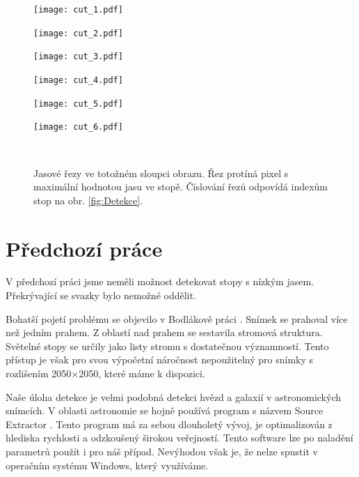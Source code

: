 \begin{figure}[htbp]
    \centering
    \begin{minipage}[c]{0.163\textwidth}
        \centering\texttt{[image: cut\_1.pdf]}
    \end{minipage}
    \begin{minipage}[c]{\xx \textwidth}
        \centering\texttt{[image: cut\_2.pdf]}
    \end{minipage}
    \begin{minipage}[c]{\xx \textwidth}
        \centering\texttt{[image: cut\_3.pdf]}
    \end{minipage}
    \begin{minipage}[c]{\xx \textwidth}
        \centering\texttt{[image: cut\_4.pdf]}
    \end{minipage}
    \begin{minipage}[c]{\xx \textwidth}
        \centering\texttt{[image: cut\_5.pdf]}
    \end{minipage}
    \begin{minipage}[c]{\xx \textwidth}
        \centering\texttt{[image: cut\_6.pdf]}
    \end{minipage}
    \\
        \caption[Jasové řezy.]{Jasové řezy ve totožném sloupci obrazu. Řez protíná pixel s maximální hodnotou jasu ve stopě. Číslování řezů odpovídá indexům stop na obr. \ref{fig:Detekce}.}
        \label{fig:rezy}
\end{figure}

\newpage

\section{Předchozí práce}

V předchozí práci \cite{Drapela} jsme neměli možnost detekovat stopy s nízkým jasem. Překrývající se svazky bylo nemožné oddělit.  

Bohatší pojetí problému se objevilo v Bodlákově práci \cite{Bodlak2005}. Snímek se prahoval více než jedním prahem. Z oblastí nad prahem se sestavila stromová struktura. Světelné stopy se určily jako listy stromu s dostatečnou významností. Tento přístup je však pro svou výpočetní náročnost nepoužitelný pro snímky s rozlišením 2050$\times$2050, které máme k dispozici. 

Naše úloha detekce je velmi podobná detekci hvězd a galaxií v astronomických snímcích. V oblasti astronomie se hojně používá program s názvem Source Extractor \cite{SEXarticle}. Tento program má za sebou dlouholetý vývoj, je optimalizován z hlediska rychlosti a odzkoušený širokou veřejností. Tento software lze po naladění parametrů použít i pro náš případ. Nevýhodou však je, že nelze spustit v operačním systému Windows, který využíváme.  

